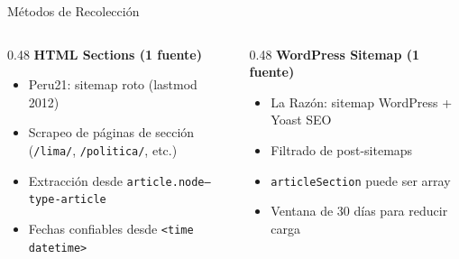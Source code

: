 \documentclass[11pt,aspectratio=169,spanish]{beamer}
\begin{document}
\begin{frame}{Métodos de Recolección}
    \vspace{0.5cm}
    \begin{columns}[T]
        \begin{column}{0.48\textwidth}
            \textbf{HTML Sections (1 fuente)}
            \begin{itemize}
                \item Peru21: sitemap roto (lastmod 2012)
                \item Scrapeo de páginas de sección \\
                  (\texttt{/lima/}, \texttt{/politica/}, etc.)
                \item Extracción desde \texttt{article.node--type-article}
                \item Fechas confiables desde \texttt{<time datetime>}
            \end{itemize}
        \end{column}
        \begin{column}{0.48\textwidth}
            \textbf{WordPress Sitemap (1 fuente)}
            \begin{itemize}
                \item La Razón: sitemap WordPress + Yoast SEO
                \item Filtrado de post-sitemaps
                \item \texttt{articleSection} puede ser array
                \item Ventana de 30 días para reducir carga
            \end{itemize}
        \end{column}
    \end{columns}
\end{frame}
\end{document}
